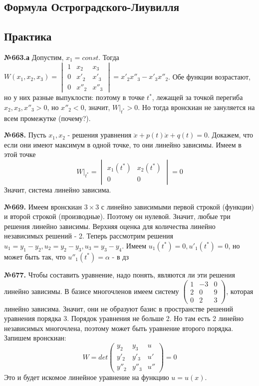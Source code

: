 \subsection{Формула Остроградского-Лиувилля}




\subsection{Практика}

\textbf{№663.а} Допустим, $x_1=const$. Тогда
    $W(x_1,x_2,x_3)=\begin{vmatrix} 1&x_2&x_3\\0&x'_2&x'_3\\0&x''_2&x''_3
    \end{vmatrix} = x'_2x''_3-x'_3x''_2$. Обе функции возрастают, но у них
    разные выпуклости: поэтому в точке $t^*$, лежащей за точкой 
    перегиба $x_2,x_3,x''_3>0$, но $x''_2<0$, значит, $W|_{t^*}>0$.
Но тогда вронскиан не зануляется на всем промежутке (почему?). 

\textbf{№668.} Пусть $x_1,x_2$ - решения уравнения $\ddot x+p(t)\dot x+q(t)=0$.
Докажем, что если они имеют максимум в одной точке, то они линейно
зависимы. Имеем в этой точке
$$W|_{t^*}=\begin{vmatrix} x_1(t^*) & x_2(t^*) \\ 0&0 \end{vmatrix}=0$$
Значит, система линейно зависима.


\textbf{№669.} Имеем вронскиан $3\times 3$ с линейно зависимыми первой строкой 
(функции) и второй строкой (производные). Поэтому он нулевой. Значит, любые
три решения линейно зависимы. Верхняя оценка для количества линейно 
независимых решений - 2. Теперь рассмотрим решения 
$u_1=y_1-y_2,u_2=y_2-y_3,u_3=y_3-y_4$. Имеем $u_1(t^*)=0,u'_1(t^*)=0$, но
может быть так, что $u''_1(t^*)=\alpha$ - в дз %

\textbf{№677.} Чтобы составить уравнение, надо понять, являются ли эти 
решения линейно зависимы. В базисе многочленов имеем систему
$\begin{pmatrix} 1&-3&0\\2&0&9\\0&2&3\end{pmatrix}$, которая линейно зависима.
Значит, они не образуют базис в пространстве решений уравнения порядка 3. 
Порядок уравнения не больше 2. Но там есть 2 линейно независимых многочлена,
поэтому может быть уравнение второго порядка. Запишем вронскиан:
$$W=det\begin{pmatrix} y_2&y_3&u\\y'_2&y'_3&u'\\y''_2&y''_3&u''\end{pmatrix}
=0$$
Это и будет искомое линейное уравнение на функцию $u=u(x)$. 

